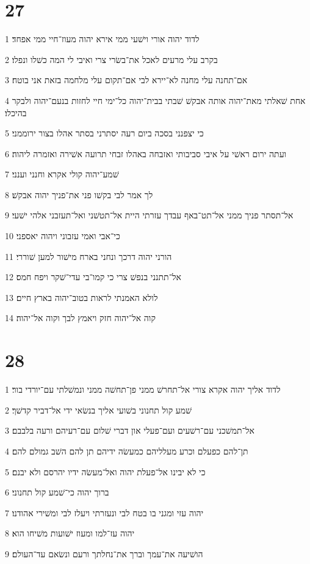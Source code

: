 \chapter{27}

\par 1 לדוד יהוה אורי וישׁעי ממי אירא יהוה מעוז־חיי ממי אפחד׃
\par 2 בקרב עלי מרעים לאכל את־בשׂרי צרי ואיבי לי המה כשׁלו ונפלו׃
\par 3 אם־תחנה עלי מחנה לא־יירא לבי אם־תקום עלי מלחמה בזאת אני בוטח׃
\par 4 אחת שׁאלתי מאת־יהוה אותה אבקשׁ שׁבתי בבית־יהוה כל־ימי חיי לחזות בנעם־יהוה ולבקר בהיכלו׃
\par 5 כי יצפנני בסכה ביום רעה יסתרני בסתר אהלו בצור ירוממני׃
\par 6 ועתה ירום ראשׁי על איבי סביבותי ואזבחה באהלו זבחי תרועה אשׁירה ואזמרה ליהוה׃
\par 7 שׁמע־יהוה קולי אקרא וחנני וענני׃
\par 8 לך אמר לבי בקשׁו פני את־פניך יהוה אבקשׁ׃
\par 9 אל־תסתר פניך ממני אל־תט־באף עבדך עזרתי היית אל־תטשׁני ואל־תעזבני אלהי ישׁעי׃
\par 10 כי־אבי ואמי עזבוני ויהוה יאספני׃
\par 11 הורני יהוה דרכך ונחני בארח מישׁור למען שׁוררי׃
\par 12 אל־תתנני בנפשׁ צרי כי קמו־בי עדי־שׁקר ויפח חמס׃
\par 13 לולא האמנתי לראות בטוב־יהוה בארץ חיים׃
\par 14 קוה אל־יהוה חזק ויאמץ לבך וקוה אל־יהוה׃

\chapter{28}

\par 1 לדוד אליך יהוה אקרא צורי אל־תחרשׁ ממני פן־תחשׁה ממני ונמשׁלתי עם־יורדי בור׃
\par 2 שׁמע קול תחנוני בשׁועי אליך בנשׂאי ידי אל־דביר קדשׁך׃
\par 3 אל־תמשׁכני עם־רשׁעים ועם־פעלי און דברי שׁלום עם־רעיהם ורעה בלבבם׃
\par 4 תן־להם כפעלם וכרע מעלליהם כמעשׂה ידיהם תן להם השׁב גמולם להם׃
\par 5 כי לא יבינו אל־פעלת יהוה ואל־מעשׂה ידיו יהרסם ולא יבנם׃
\par 6 ברוך יהוה כי־שׁמע קול תחנוני׃
\par 7 יהוה עזי ומגני בו בטח לבי ונעזרתי ויעלז לבי ומשׁירי אהודנו׃
\par 8 יהוה עז־למו ומעוז ישׁועות משׁיחו הוא׃
\par 9 הושׁיעה את־עמך וברך את־נחלתך ורעם ונשׂאם עד־העולם׃

